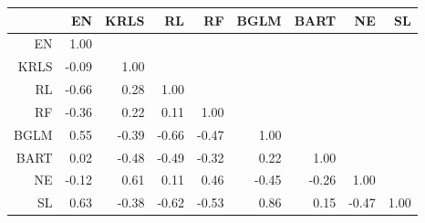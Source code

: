 \begin{table}[ht]
\centering
\begin{tabular}{rrrrrrrrr}
  \hline
 & EN & KRLS & RL & RF & BGLM & BART & NE & SL \\ 
  \hline
EN & 1.00 &  &  &  &  &  &  &  \\ 
  KRLS & -0.09 & 1.00 &  &  &  &  &  &  \\ 
  RL & -0.66 & 0.28 & 1.00 &  &  &  &  &  \\ 
  RF & -0.36 & 0.22 & 0.11 & 1.00 &  &  &  &  \\ 
  BGLM & 0.55 & -0.39 & -0.66 & -0.47 & 1.00 &  &  &  \\ 
  BART & 0.02 & -0.48 & -0.49 & -0.32 & 0.22 & 1.00 &  &  \\ 
  NE & -0.12 & 0.61 & 0.11 & 0.46 & -0.45 & -0.26 & 1.00 &  \\ 
  SL & 0.63 & -0.38 & -0.62 & -0.53 & 0.86 & 0.15 & -0.47 & 1.00 \\ 
   \hline
\end{tabular}
\end{table}
